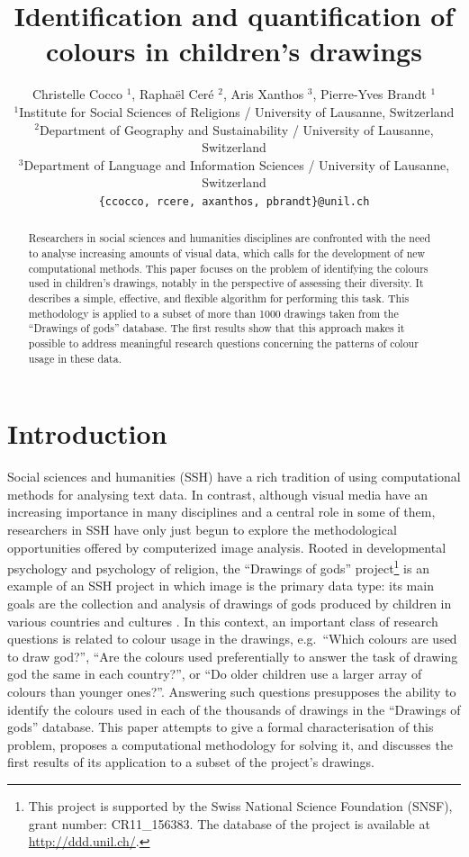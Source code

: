 \documentclass[11pt,a4paper]{article}
\title{Identification and quantification of colours in children's drawings}
\author{Christelle Cocco ${}^1$, Rapha\"el Cer\'e ${}^2$, Aris Xanthos ${}^3$,  Pierre-Yves Brandt ${}^1$\\
  ${}^1$Institute for Social Sciences of Religions / University of Lausanne, Switzerland \\
  ${}^2$Department of Geography and Sustainability / University of Lausanne, Switzerland \\
  ${}^3$Department of Language and Information Sciences / University of Lausanne, Switzerland \\
  {\tt \{ccocco, rcere, axanthos, pbrandt\}@unil.ch} \\
  }
\date{}
\begin{document}
\maketitle
\begin{abstract}
Researchers in social sciences and humanities disciplines are confronted with the need to analyse increasing amounts of visual data, which calls for the development of new computational methods. This paper focuses on the problem of identifying the colours used in children's drawings, notably in the perspective of assessing their diversity. It describes a simple, effective, and flexible algorithm for performing this task. This methodology is applied to a subset of more than 1000 drawings taken from the ``Drawings of gods'' database. The first results show that this approach makes it possible to address meaningful research questions concerning the patterns of colour usage in these data. 
\end{abstract}


\section{Introduction}\label{introduction}
\label{sec:introduction}

Social sciences and humanities (SSH) have a rich tradition of using computational methods for analysing text data. In contrast, although visual media have an increasing importance in many disciplines and a central role in some of them, researchers in SSH have only just begun to explore the methodological opportunities offered by computerized image analysis. Rooted in developmental psychology and psychology of religion, the ``Drawings of gods'' project\footnote{This project is supported by the Swiss National Science Foundation (SNSF), grant number: CR11\_156383. The database of the project is available at \url{http://ddd.unil.ch/}.} is an example of an SSH project in which image is the primary data type: its main goals are the collection and analysis of drawings of gods produced by children in various countries and cultures \cite[see e.g.][]{BrandtKagataSpittelerGillieronPaleologue2009,Dandarova2013,DandarovaRobertDessartSerbaevaEtAl2016}. In this context, an important class of research questions is related to colour usage in the drawings, e.g.~``Which colours are used to draw god?'', ``Are the colours used preferentially to answer the task of drawing god the same in each country?'', or ``Do older children use a larger array of colours than younger ones?''. Answering such questions presupposes the ability to identify the colours used in each of the thousands of drawings in the ``Drawings of gods'' database. This paper attempts to give a formal characterisation of this problem, proposes a computational methodology for solving it, and discusses the first results of its application to a subset of the project's drawings.
\end{document}
